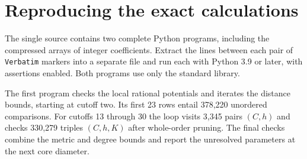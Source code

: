 \documentclass[11pt,a4paper]{article}
\newcommand{\volappendix}{\setcounter{section}{0}\setcounter{subsection}{0}\volumeappendixtrue\renewcommand{\thesection}{\Alph{section}}}
\begin{document}
\clearpage\volappendix
\section{Reproducing the exact calculations}
The single source contains two complete Python programs, including the compressed arrays of integer coefficients. Extract the lines between each pair of \texttt{Verbatim} markers into a separate file and run each with Python 3.9 or later, with assertions enabled. Both programs use only the standard library.

The first program checks the local rational potentials and iterates the distance bounds, starting at cutoff two. Its first 23 rows entail 378,220 unordered comparisons. For cutoffs 13 through 30 the loop visits 3,345 pairs $(C,h)$ and checks 330,279 triples $(C,h,K)$ after whole-order pruning. The final checks combine the metric and degree bounds and report the unresolved parameters at the next core diameter.
\end{document}
